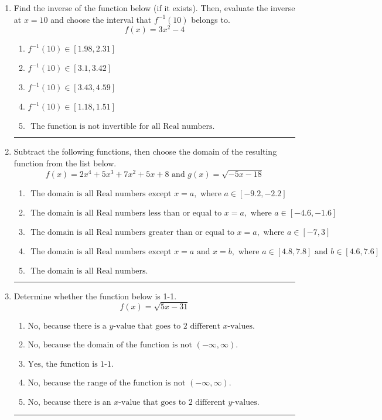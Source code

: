 \documentclass[14pt]{extbook}
\newcommand{\litem}[1]{\item#1\hspace*{-1cm}\rule{\textwidth}{0.4pt}}
\begin{document}
\begin{enumerate}
\litem{
Find the inverse of the function below (if it exists). Then, evaluate the inverse at $x = 10$ and choose the interval that $f^{-1}(10)$ belongs to.\[ f(x) = 3 x^2 - 4 \]\begin{enumerate}[label=\Alph*.]
\item \( f^{-1}(10) \in [1.98, 2.31] \)
\item \( f^{-1}(10) \in [3.1, 3.42] \)
\item \( f^{-1}(10) \in [3.43, 4.59] \)
\item \( f^{-1}(10) \in [1.18, 1.51] \)
\item \( \text{ The function is not invertible for all Real numbers. } \)

\end{enumerate} }
\litem{
Subtract the following functions, then choose the domain of the resulting function from the list below.\[ f(x) = 2x^{4} +5 x^{3} +7 x^{2} +5 x + 8 \text{ and } g(x) = \sqrt{-5x-18}  \]\begin{enumerate}[label=\Alph*.]
\item \( \text{ The domain is all Real numbers except } x = a, \text{ where } a \in [-9.2, -2.2] \)
\item \( \text{ The domain is all Real numbers less than or equal to } x = a, \text{ where } a \in [-4.6, -1.6] \)
\item \( \text{ The domain is all Real numbers greater than or equal to } x = a, \text{ where } a \in [-7, 3] \)
\item \( \text{ The domain is all Real numbers except } x = a \text{ and } x = b, \text{ where } a \in [4.8, 7.8] \text{ and } b \in [4.6, 7.6] \)
\item \( \text{ The domain is all Real numbers. } \)

\end{enumerate} }
\litem{
Determine whether the function below is 1-1.\[ f(x) = \sqrt{5 x - 31} \]\begin{enumerate}[label=\Alph*.]
\item \( \text{No, because there is a $y$-value that goes to 2 different $x$-values.} \)
\item \( \text{No, because the domain of the function is not $(-\infty, \infty)$.} \)
\item \( \text{Yes, the function is 1-1.} \)
\item \( \text{No, because the range of the function is not $(-\infty, \infty)$.} \)
\item \( \text{No, because there is an $x$-value that goes to 2 different $y$-values.} \)


\end{enumerate}}
\end{enumerate}
\end{document}
